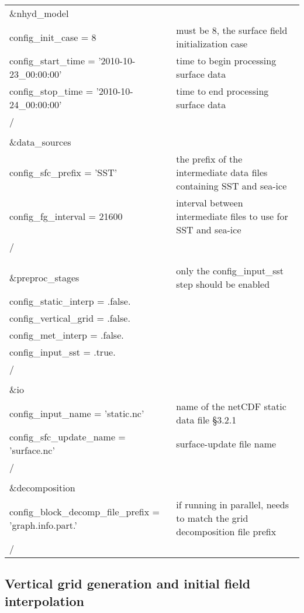 \begin{longtable}{p{3.0in} |p{3.25in}}
\&nhyd\_model\\
   config\_init\_case       = 8                      & must be 8, the surface field initialization case \\
   config\_start\_time      = '2010-10-23\_00:00:00' & time to begin processing surface data \\
   config\_stop\_time       = '2010-10-24\_00:00:00' & time to end processing surface data \\
/\\
\\
\&data\_sources\\
   config\_sfc\_prefix      = 'SST'                  & the prefix of the intermediate data files containing SST and sea-ice \\
   config\_fg\_interval     = 21600                  & interval between intermediate files to use for SST and sea-ice \\
/\\
\\
\\
\&preproc\_stages                                    & only the config\_input\_sst step should be enabled \\
   config\_static\_interp   = .false.                & \\
   config\_vertical\_grid   = .false.                & \\
   config\_met\_interp      = .false.                & \\
   config\_input\_sst       = .true.                 & \\
/\\
\\
\&io\\
   config\_input\_name          = 'static.nc'        & name of the netCDF static data file \S 3.2.1 \\
   config\_sfc\_update\_name    = 'surface.nc'       & surface-update file name \\
/\\
\\
\&decomposition\\
   config\_block\_decomp\_file\_prefix = 'graph.info.part.' & if running in parallel, needs to match the grid decomposition file prefix \\
/\\

\end{longtable}



\subsection{Vertical grid generation and initial field interpolation}

